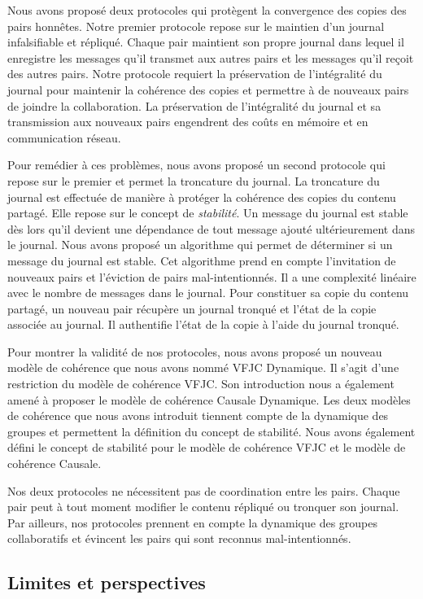 Nous avons proposé deux protocoles qui protègent la convergence des copies des pairs honnêtes.
Notre premier protocole repose sur le maintien d'un journal infalsifiable et répliqué.
Chaque pair maintient son propre journal dans lequel il enregistre les messages qu'il transmet aux autres pairs et les messages qu'il reçoit des autres pairs.
Notre protocole requiert la préservation de l'intégralité du journal pour maintenir la cohérence des copies et permettre à de nouveaux pairs de joindre la collaboration.
La préservation de l'intégralité du journal et sa transmission aux nouveaux pairs engendrent des coûts en mémoire et en communication réseau.

Pour remédier à ces problèmes, nous avons proposé un second protocole qui repose sur le premier et permet la troncature du journal.
La troncature du journal est effectuée de manière à protéger la cohérence des copies du contenu partagé.
Elle repose sur le concept de \emph{stabilité}.
Un message du journal est stable dès lors qu'il devient une dépendance de tout message ajouté ultérieurement dans le journal.
Nous avons proposé un algorithme qui permet de déterminer si un message du journal est stable.
Cet algorithme prend en compte l'invitation de nouveaux pairs et l'éviction de pairs mal-intentionnés.
Il a une complexité linéaire avec le nombre de messages dans le journal.
Pour constituer sa copie du contenu partagé, un nouveau pair récupère un journal tronqué et l'état de la copie associée au journal.
Il authentifie l'état de la copie à l'aide du journal tronqué.

Pour montrer la validité de nos protocoles, nous avons proposé un nouveau modèle de cohérence que nous avons nommé \acl{VFJC} Dynamique.
Il s'agit d'une restriction du modèle de cohérence \acf{VFJC}.
Son introduction nous a également amené à proposer le modèle de cohérence Causale Dynamique.
Les deux modèles de cohérence que nous avons introduit tiennent compte de la dynamique des groupes et permettent la définition du concept de stabilité.
Nous avons également défini le concept de stabilité pour le modèle de cohérence \acs{VFJC} et le modèle de cohérence Causale.

Nos deux protocoles ne nécessitent pas de coordination entre les pairs.
Chaque pair peut à tout moment modifier le contenu répliqué ou tronquer son journal.
Par ailleurs, nos protocoles prennent en compte la dynamique des groupes collaboratifs et évincent les pairs qui sont reconnus mal-intentionnés.

\subsection{Limites et perspectives}

